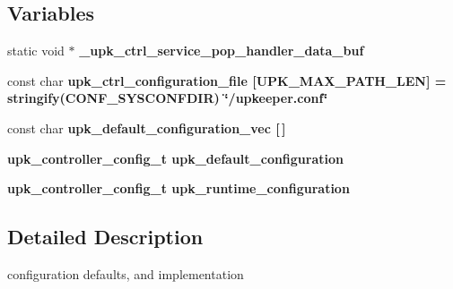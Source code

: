 \subsection*{Variables}
\begin{CompactItemize}
\item 
static void $\ast$ \bf{\_\-upk\_\-ctrl\_\-service\_\-pop\_\-handler\_\-data\_\-buf}
\item 
const char \bf{upk\_\-ctrl\_\-configuration\_\-file} [UPK\_\-MAX\_\-PATH\_\-LEN] = stringify(CONF\_\-SYSCONFDIR) \char`\"{}/upkeeper.conf\char`\"{}
\item 
const char \bf{upk\_\-default\_\-configuration\_\-vec} [$\,$]
\item 
\bf{upk\_\-controller\_\-config\_\-t} \bf{upk\_\-default\_\-configuration}
\item 
\bf{upk\_\-controller\_\-config\_\-t} \bf{upk\_\-runtime\_\-configuration}
\end{CompactItemize}


\subsection{Detailed Description}
configuration defaults, and implementation 

